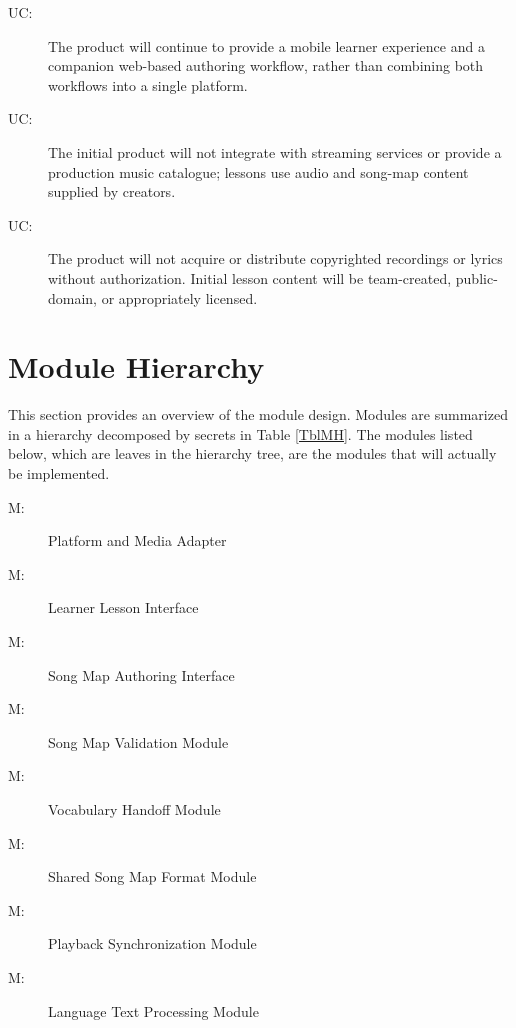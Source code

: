 \documentclass[12pt, titlepage]{article}
\newcounter{ucnum}
\newcommand{\uctheucnum}{UC\theucnum}
\newcounter{mnum}
\newcommand{\mthemnum}{M\themnum}
\begin{document}
\begin{description}
\item[ \uctheucnum \label{ucProduct}:] The product will
  continue to provide a mobile learner experience and a companion web-based
  authoring workflow, rather than combining both workflows into a single
  platform.
\item[ \uctheucnum \label{ucStreaming}:] The initial
  product will not integrate with streaming services or provide a production
  music catalogue; lessons use audio and song-map content supplied by creators.
\item[ \uctheucnum \label{ucContentRights}:] The product
  will not acquire or distribute copyrighted recordings or lyrics without
  authorization. Initial lesson content will be team-created, public-domain, or
  appropriately licensed.
\end{description}

\section{Module Hierarchy} \label{SecMH}

This section provides an overview of the module design. Modules are summarized
in a hierarchy decomposed by secrets in Table \ref{TblMH}. The modules listed
below, which are leaves in the hierarchy tree, are the modules that will
actually be implemented.

\begin{description}
\item [ \mthemnum \label{mHH}:] Platform and Media Adapter
\item [ \mthemnum \label{mLearner}:] Learner Lesson Interface
\item [ \mthemnum \label{mEditor}:] Song Map Authoring Interface
\item [ \mthemnum \label{mValidate}:] Song Map Validation Module
\item [ \mthemnum \label{mAnki}:] Vocabulary Handoff Module
\item [ \mthemnum \label{mMap}:] Shared Song Map Format Module
\item [ \mthemnum \label{mSync}:] Playback Synchronization Module
\item [ \mthemnum \label{mLanguage}:] Language Text Processing Module
\end{description}
\end{document}
